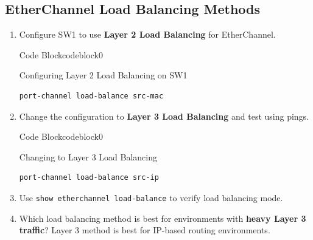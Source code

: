 \documentclass[a4paper]{article}
\begin{document}
\subsection{EtherChannel Load Balancing Methods}
\begin{enumerate}
	\item Configure SW1 to use \textbf{Layer 2 Load Balancing} for EtherChannel.


	      \begin{ocg}{Code Block}{codeblock}{0}

		      \vspace{0.5cm}
		      Configuring Layer 2 Load Balancing on SW1
		      \begin{lstlisting}
port-channel load-balance src-mac
    \end{lstlisting}

		      \vspace{0.5cm}
	      \end{ocg}


	\item Change the configuration to \textbf{Layer 3 Load Balancing} and test using pings.


	      \begin{ocg}{Code Block}{codeblock}{0}

		      \vspace{0.5cm}
		      Changing to Layer 3 Load Balancing
		      \begin{lstlisting}
port-channel load-balance src-ip
    \end{lstlisting}

		      \vspace{0.5cm}
	      \end{ocg}


	\item Use \texttt{show etherchannel load-balance} to verify load balancing mode.
	\item Which load balancing method is best for environments with \textbf{heavy Layer 3 traffic}?
	      Layer 3 method is best for IP-based routing environments.


\end{enumerate}
\end{document}
